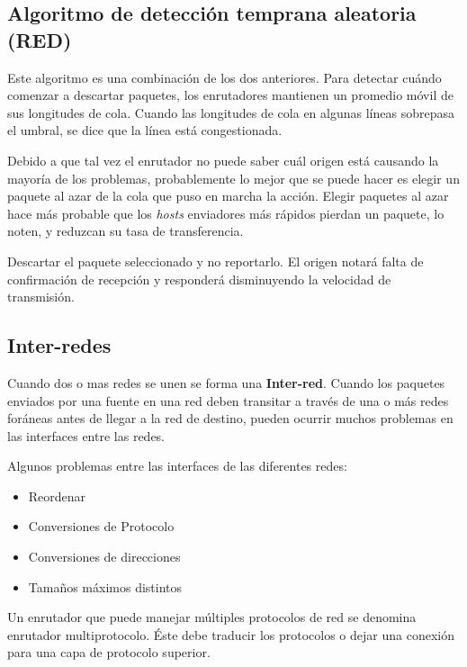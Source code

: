 \documentclass[10pt,a4paper]{report}
\begin{document}
	\subsection{Algoritmo de detección temprana aleatoria (RED)}
	
		\par Este algoritmo es una combinación de los dos anteriores. Para detectar cuándo comenzar a descartar paquetes, los enrutadores mantienen un promedio móvil de sus longitudes de cola. Cuando las longitudes de cola en algunas líneas sobrepasa el umbral, se dice que la línea está congestionada. 
		
		\par Debido a que tal vez el enrutador no puede saber cuál origen está causando la mayoría de los problemas, probablemente lo mejor que se puede hacer es elegir un paquete al azar de la cola que puso en marcha la acción. Elegir paquetes al azar hace más probable que los \textit{hosts} enviadores más rápidos pierdan un paquete, lo noten, y reduzcan su tasa de transferencia.

		\par Descartar el paquete seleccionado y no reportarlo. El origen notará falta de confirmación de recepción y responderá disminuyendo la velocidad de transmisión.

	 \subsection{Inter-redes}
	 Cuando dos o mas redes se unen se forma una \textbf{Inter-red}. Cuando los paquetes enviados por una fuente en una red deben transitar a través de una o más redes
foráneas antes de llegar a la red de destino, pueden ocurrir muchos problemas en las interfaces entre
las redes.

	\par Algunos problemas entre las interfaces de las diferentes redes:
	\begin{itemize}
		\item Reordenar
		\item Conversiones de Protocolo
		\item Conversiones de direcciones
		\item Tamaños máximos distintos
	\end{itemize}
	Un enrutador que puede manejar múltiples protocolos de red se denomina enrutador multiprotocolo. Éste debe traducir los protocolos o dejar una conexión para una capa de protocolo superior.
\end{document}
